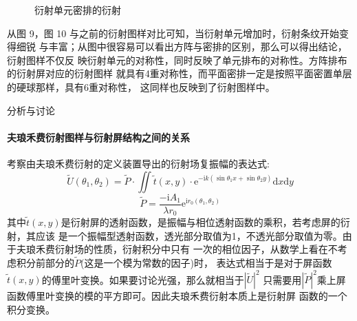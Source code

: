 \documentclass[a4paper]{ctexart}
\makeatletter
\renewcommand{\section}{\@startsection{section}{1}{0mm}
	{-\baselineskip}{0.5\baselineskip}{\bf\leftline}}
\makeatother
\begin{document}
    \begin{figure}[htbp]
        \centering
    \quad
    \quad
    \caption{衍射单元密排的衍射}
    \end{figure}
    \par 
    从图 9，图 10 与之前的衍射图样对比可知，当衍射单元增加时，衍射条纹开始变得细锐
    与丰富；从图中很容易可以看出方阵与密排的区别，那么可以得出结论，衍射图样不仅反
    映衍射单元的对称性，同时反映了单元排布的对称性。方阵排布的衍射屏对应的衍射图样
    就具有4重对称性，而平面密排一定是按照平面密置单层的硬球那样，具有6重对称性，
    这同样也反映到了衍射图样中。
    \section{\large{分析与讨论}}
    \paragraph{夫琅禾费衍射图样与衍射屏结构之间的关系}
    考察由夫琅禾费衍射的定义装置导出的衍射场复振幅的表达式:
    $$
    \widetilde{U}(\theta_{1},\theta_{2}) = \widetilde{P} \cdot \iint \widetilde{t}(x,y) \cdot \mathrm{e}^{-\mathrm{i}k(\sin \theta_{1} x + \sin \theta_{2}y)}\mathrm{d}x\mathrm{d}y
    $$
    $$
    \widetilde{P} = \frac{-\mathrm{i}A_{1}}{\lambda r_{0}} \mathrm{e}^{\mathrm{i}r_{0}(\theta_{1},\theta_{2})}
    $$
    其中$\widetilde{t}(x, y)$是衍射屏的透射函数，是振幅与相位透射函数的乘积，若考虑屏的衍射，其应该
    是一个振幅型透射函数，透光部分取值为1，不透光部分取值为零。由于夫琅禾费衍射场的性质，衍射积分中只有
    一次的相位因子，从数学上看在不考虑积分前部分的$\widetilde{P}$(这是一个模为常数的因子)时，
    表达式相当于是对于屏函数$\widetilde{t}(x, y)$的傅里叶变换。如果要讨论光强，那么就相当于$|\widetilde{U}|^{2}$
    只需要用$|\widetilde{P}|^{2}$乘上屏函数傅里叶变换的模的平方即可。因此夫琅禾费衍射本质上是衍射屏
    函数的一个积分变换。
\end{document}
